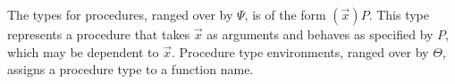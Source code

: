 The types for procedures, ranged over by $\Psi$, is of the form
$(\vec{x})P$.  This type represents a procedure that takes $\vec{x}$ as
arguments and behaves as specified by $P$, which may be dependent to
$\vec{x}$.  Procedure type environments, ranged over by $\Theta$,
assigns a procedure type to a function name.




